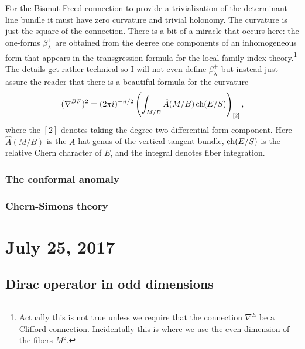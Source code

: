 \documentclass{amsart}
\begin{document}
For the Bismut-Freed connection to provide a trivialization of the determinant line bundle
it must have zero curvature and trivial holonomy. The curvature is just the square of
the connection. There is a bit of a miracle that occurs here: the one-forms $\beta_\lambda^+$
are obtained
from the degree one components of an inhomogeneous form that appears in the transgression
formula for the local family index theory.\footnote{Actually this is not true
unless we require that the connection $\nabla^E$ be a Clifford connection. Incidentally
this is where we use the even dimension of the fibers $M^z$.}
The details get rather technical so I will not even define $\beta_\lambda^+$ but instead
just assure the reader that there is a beautiful formula for the curvature
\begin{equation*}
    (\nabla^{BF})^2 = (2\pi i)^{-n/2}\left(\int_{M/B}\hat A(M/B)\operatorname{ch}(E/S)\right)_{[2]},
\end{equation*}
where the $[2]$ denotes taking the degree-two differential form component. Here
$\hat A(M/B)$ is the $A$-hat genus of the vertical tangent bundle, $\operatorname{ch}(E/S)$
is the relative Chern character of $E$, and the integral denotes fiber integration.


\subsubsection{The conformal anomaly}

\subsubsection{Chern-Simons theory}


\section{July 25, 2017}

\subsection{Dirac operator in odd dimensions}
\end{document}
